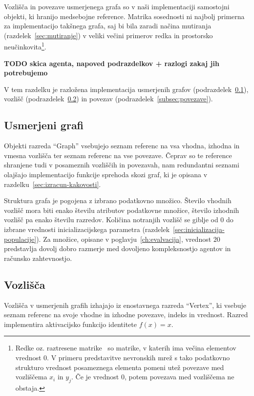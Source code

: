 \documentclass[a4paper,12pt,openright]{book}
\begin{document}
    Vozlišča in povezave usmerjenega grafa so v naši implementaciji samostojni objekti, ki hranijo medsebojne reference.
    Matrika sosednosti ni najbolj primerna za implementacijo takšnega grafa, saj bi bila zaradi načina mutiranja (razdelek~\ref{sec:mutiranje})
    v veliki večini primerov redka in prostorsko neučinkovita\footnote{Redke oz. raztresene matrike~\cite{enwiki:1196108633}
    so matrike, v katerih ima večina elementov vrednost 0.
    V primeru predstavitve nevronskih mrež s tako podatkovno strukturo vrednost posameznega elementa pomeni utež povezave
    med vozliščema $x_i$ in $y_j$.
    Če je vrednost 0, potem povezava med vozliščema ne obstaja.}.

    \textbf{TODO skica agenta, napoved podrazdelkov + razlogi zakaj jih potrebujemo}

    V tem razdelku je razložena implementacija usmerjenih grafov (podrazdelek~\ref{subsec:usmerjeni-grafi}),
    vozlišč (podrazdelek~\ref{subsec:vozlisca}) in povezav (podrazdelek~\ref{subsec:povezave}).


    \subsection{Usmerjeni grafi}\label{subsec:usmerjeni-grafi}
    Objekti razreda \enquote{Graph} vsebujejo seznam referenc na vsa vhodna, izhodna in vmesna vozlišča ter seznam referenc
    na vse povezave.
    Čeprav so te reference shranjene tudi v posameznih vozliščih in povezavah, nam redundantni seznami olajšajo
    implementacijo funkcije sprehoda skozi graf, ki je opisana v razdelku~\ref{sec:izracun-kakovosti}.

    Struktura grafa je pogojena z izbrano podatkovno množico.
    Število vhodnih vozlišč mora biti enako številu atributov podatkovne mno\-ži\-ce, šte\-vi\-lo izhodnih vozlišč pa enako številu razredov.
    Količina notranjih vozlišč se giblje od 0 do izbrane vrednosti inicializacijskega parametra (razdelek~\ref{sec:inicializacija-populacije}).
    Za množice, opisane v poglavju~\ref{ch:evalvacija}, vrednost $20$ predstavlja dovolj dobro razmerje med dovoljeno kompleksnostjo agentov in
    računsko zahtevnostjo.

    \subsection{Vozlišča}\label{subsec:vozlisca}
    Vozlišča v usmerjenih grafih izhajajo iz enostavnega razreda \enquote{Vertex}, ki vsebuje seznam referenc
    na svoje vhodne in izhodne povezave, indeks in vrednost.
    Razred implementira aktivacijsko funkcijo identitete $f(x)=x$.
\end{document}
